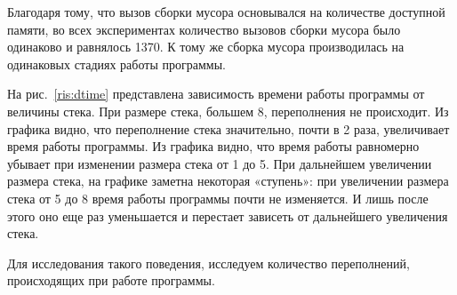 Благодаря тому, что вызов сборки мусора основывался на количестве доступной памяти, во всех экспериментах количество вызовов сборки мусора было одинаково и равнялось 
1370. К тому же сборка мусора производилась на одинаковых стадиях работы программы.

На рис.~\ref{ris:dtime} представлена зависимость времени работы программы от
величины стека. При размере стека, большем 8, переполнения не происходит. Из графика видно, что переполнение стека значительно, почти в 2 раза, увеличивает 
время работы программы. Из графика видно, что время работы равномерно убывает при изменении размера стека от 1 до 5. При дальнейшем увеличении размера стека, 
на графике заметна некоторая «ступень»: при увеличении размера стека от 5 до 8 время работы программы почти не изменяется. И лишь после этого оно еще раз уменьшается 
и перестает зависеть от дальнейшего увеличения стека. 

Для исследования такого поведения, исследуем количество переполнений, происходящих при работе программы.

